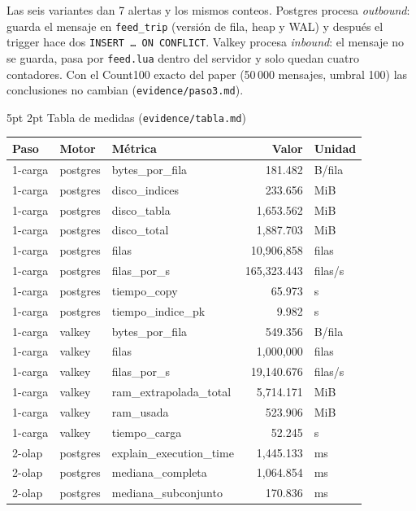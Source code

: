 \documentclass[10pt,letterpaper]{article}
\makeatletter
\renewcommand\subsection{\@startsection{subsection}{2}{\z@}%
  {5pt \@plus 1pt}{2pt}%
  {\normalfont\small\bfseries\color{acc}}}
\makeatother
\begin{document}
Las seis variantes dan 7 alertas y los mismos conteos. Postgres procesa \emph{outbound}: guarda el mensaje
en \texttt{feed\_trip} (versión de fila, heap y WAL) y después el trigger hace dos
\texttt{INSERT … ON CONFLICT}. Valkey procesa \emph{inbound}: el mensaje no se guarda, pasa por
\texttt{feed.lua} dentro del servidor y solo quedan cuatro contadores. Con el Count100 exacto del paper
(50\,000 mensajes, umbral 100) las conclusiones no cambian (\texttt{evidence/paso3.md}).

\subsection{Tabla de medidas (\texttt{evidence/tabla.md})}

\begin{center}\scriptsize
\begin{tabular}{@{}lllrl@{}}
\toprule
\textbf{Paso} & \textbf{Motor} & \textbf{Métrica} & \textbf{Valor} & \textbf{Unidad} \\
\midrule
1-carga & postgres & bytes\_por\_fila & 181.482 & B/fila \\
1-carga & postgres & disco\_indices & 233.656 & MiB \\
1-carga & postgres & disco\_tabla & 1,653.562 & MiB \\
1-carga & postgres & disco\_total & 1,887.703 & MiB \\
1-carga & postgres & filas & 10,906,858 & filas \\
1-carga & postgres & filas\_por\_s & 165,323.443 & filas/s \\
1-carga & postgres & tiempo\_copy & 65.973 & s \\
1-carga & postgres & tiempo\_indice\_pk & 9.982 & s \\
1-carga & valkey & bytes\_por\_fila & 549.356 & B/fila \\
1-carga & valkey & filas & 1,000,000 & filas \\
1-carga & valkey & filas\_por\_s & 19,140.676 & filas/s \\
1-carga & valkey & ram\_extrapolada\_total & 5,714.171 & MiB \\
1-carga & valkey & ram\_usada & 523.906 & MiB \\
1-carga & valkey & tiempo\_carga & 52.245 & s \\
2-olap & postgres & explain\_execution\_time & 1,445.133 & ms \\
2-olap & postgres & mediana\_completa & 1,064.854 & ms \\
2-olap & postgres & mediana\_subconjunto & 170.836 & ms \\

\end{tabular}
\end{center}
\end{document}
